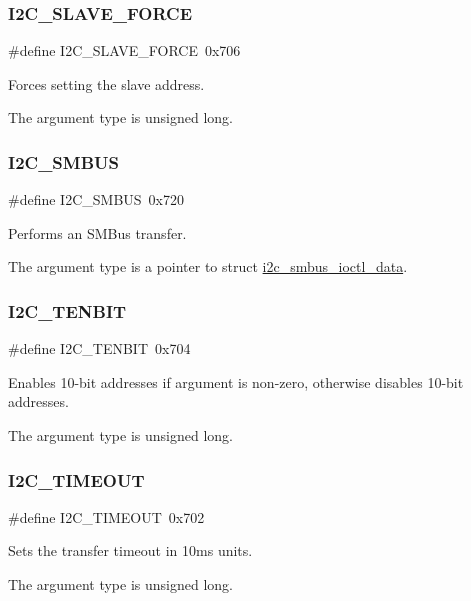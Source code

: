 \subsubsection{\texorpdfstring{I2C\_SLAVE\_FORCE}{I2C\_SLAVE\_FORCE}}
{\footnotesize\ttfamily \#define I2\+C\+\_\+\+S\+L\+A\+V\+E\+\_\+\+F\+O\+R\+CE~0x706}



Forces setting the slave address. 

The argument type is unsigned long. \mbox{\label{group__I2CLinux_ga4e9d483fb9eb1074646726ce518b1d4d}} 
\subsubsection{\texorpdfstring{I2C\_SMBUS}{I2C\_SMBUS}}
{\footnotesize\ttfamily \#define I2\+C\+\_\+\+S\+M\+B\+US~0x720}



Performs an S\+M\+Bus transfer. 

The argument type is a pointer to struct \mbox{\hyperlink{structi2c__smbus__ioctl__data}{i2c\+\_\+smbus\+\_\+ioctl\+\_\+data}}. \mbox{\label{group__I2CLinux_ga2a0b1f3843e98977be7476579c851305}} 
\subsubsection{\texorpdfstring{I2C\_TENBIT}{I2C\_TENBIT}}
{\footnotesize\ttfamily \#define I2\+C\+\_\+\+T\+E\+N\+B\+IT~0x704}



Enables 10-\/bit addresses if argument is non-\/zero, otherwise disables 10-\/bit addresses. 

The argument type is unsigned long. \mbox{\label{group__I2CLinux_gafa3215f0aa766367f5d34bee80929152}} 
\subsubsection{\texorpdfstring{I2C\_TIMEOUT}{I2C\_TIMEOUT}}
{\footnotesize\ttfamily \#define I2\+C\+\_\+\+T\+I\+M\+E\+O\+UT~0x702}



Sets the transfer timeout in 10ms units. 

The argument type is unsigned long. 